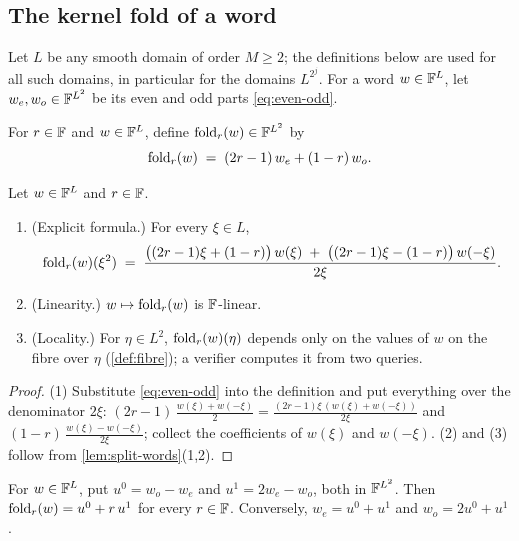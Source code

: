 \subsection{The kernel fold of a word}\label{sec:fold:words}

Let $L$ be any smooth domain of order $M \ge 2$; the definitions below are used for all such domains, in particular for the domains $L^{2^j}$.
For a word $w \in \mathbb{F}^L$, let $w_e, w_o \in \mathbb{F}^{L^2}$ be its even and odd parts \eqref{eq:even-odd}.

\begin{definition}\label{def:fold-word}
For $r \in \mathbb{F}$ and $w \in \mathbb{F}^L$, define $\mathrm{fold}_r(w) \in \mathbb{F}^{L^2}$ by
\[
  \mathrm{fold}_r(w) \;=\; (2r-1)\,w_e + (1-r)\,w_o .
\]
\end{definition}

\begin{lemma}\label{lem:fold-word}
Let $w \in \mathbb{F}^L$ and $r \in \mathbb{F}$.
\begin{enumerate}
  \item (Explicit formula.) For every $\xi \in L$,
  \begin{equation}\label{eq:fold-explicit}
    \mathrm{fold}_r(w)(\xi^2) \;=\; \frac{\bigl((2r-1)\xi + (1-r)\bigr)\, w(\xi) \;+\; \bigl((2r-1)\xi - (1-r)\bigr)\, w(-\xi)}{2\xi}.
  \end{equation}
  \item (Linearity.) $w \mapsto \mathrm{fold}_r(w)$ is $\mathbb{F}$-linear.
  \item (Locality.) For $\eta \in L^2$, $\mathrm{fold}_r(w)(\eta)$ depends only on the values of $w$ on the fibre over $\eta$ (\cref{def:fibre}); a verifier computes it from two queries.
\end{enumerate}
\end{lemma}

\begin{proof}
(1) Substitute \eqref{eq:even-odd} into the definition and put everything over the denominator $2\xi$:
$(2r-1)\,\frac{w(\xi)+w(-\xi)}{2} = \frac{(2r-1)\xi\,(w(\xi)+w(-\xi))}{2\xi}$ and $(1-r)\,\frac{w(\xi)-w(-\xi)}{2\xi}$; collect the coefficients of $w(\xi)$ and $w(-\xi)$.
(2) and (3) follow from \cref{lem:split-words}(1,2).
\end{proof}

\begin{lemma}\label{lem:line}
For $w \in \mathbb{F}^L$, put $u^0 = w_o - w_e$ and $u^1 = 2w_e - w_o$, both in $\mathbb{F}^{L^2}$. Then $\mathrm{fold}_r(w) = u^0 + r\,u^1$ for every $r \in \mathbb{F}$.
Conversely, $w_e = u^0 + u^1$ and $w_o = 2u^0 + u^1$.
\end{lemma}

